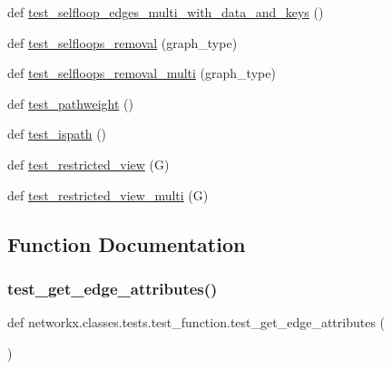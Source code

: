 \begin{DoxyCompactItemize}
\item 
def \hyperlink{namespacenetworkx_1_1classes_1_1tests_1_1test__function_abc157323eefe232def6cabf2322e07f8}{test\+\_\+selfloop\+\_\+edges\+\_\+multi\+\_\+with\+\_\+data\+\_\+and\+\_\+keys} ()
\item 
def \hyperlink{namespacenetworkx_1_1classes_1_1tests_1_1test__function_acc2a7dce89686c95301160b29d6aa8e1}{test\+\_\+selfloops\+\_\+removal} (graph\+\_\+type)
\item 
def \hyperlink{namespacenetworkx_1_1classes_1_1tests_1_1test__function_a4992fcd3a86f44d07ba1c34ce709127c}{test\+\_\+selfloops\+\_\+removal\+\_\+multi} (graph\+\_\+type)
\item 
def \hyperlink{namespacenetworkx_1_1classes_1_1tests_1_1test__function_ad3fadc75fcb7def28c333e5d97dc384e}{test\+\_\+pathweight} ()
\item 
def \hyperlink{namespacenetworkx_1_1classes_1_1tests_1_1test__function_a60f4122cc0b4c00bcb3bded4c8043f94}{test\+\_\+ispath} ()
\item 
def \hyperlink{namespacenetworkx_1_1classes_1_1tests_1_1test__function_a1282de47aeb87310f9782755b0c36756}{test\+\_\+restricted\+\_\+view} (G)
\item 
def \hyperlink{namespacenetworkx_1_1classes_1_1tests_1_1test__function_afed3bbe48bc20540661b9a5c2e2ee95c}{test\+\_\+restricted\+\_\+view\+\_\+multi} (G)
\end{DoxyCompactItemize}


\subsection{Function Documentation}
\mbox{\label{namespacenetworkx_1_1classes_1_1tests_1_1test__function_ae9f4e44d237d87bd6ca9bc5aca7a080a}} 
\subsubsection{\texorpdfstring{test\+\_\+get\+\_\+edge\+\_\+attributes()}{test\_get\_edge\_attributes()}}
{\footnotesize\ttfamily def networkx.\+classes.\+tests.\+test\+\_\+function.\+test\+\_\+get\+\_\+edge\+\_\+attributes (\begin{DoxyParamCaption}{ }\end{DoxyParamCaption})}

